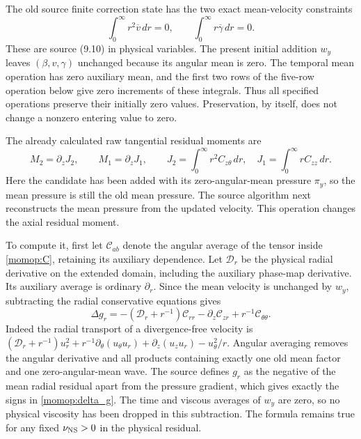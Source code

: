 \documentclass[11pt]{article}
\begin{document}
The old source finite correction state has the two exact mean-velocity
constraints
\[
 \int_0^\infty r^2\overline v\,dr=0,\qquad
 \int_0^\infty r\overline\gamma\,dr=0 .
\]
These are source (9.10) in physical variables. The present initial
addition $w_y$ leaves $(\beta,v,\gamma)$ unchanged because its angular
mean is zero. The temporal mean operation has zero auxiliary mean,
and the first two rows of the five-row operation below give zero
increments of these integrals. Thus all specified operations preserve
their initially zero values. Preservation, by itself, does not change
a nonzero entering value to zero.

The already calculated raw tangential residual moments are
\[
 M_2=\partial_zJ_2,\qquad M_1=\partial_zJ_1,\qquad
 J_2=\int_0^\infty r^2C_{z\theta}\,dr,\quad
 J_1=\int_0^\infty rC_{zz}\,dr.
\]
Here the candidate has been added with its zero-angular-mean pressure
$\pi_y$, so the mean pressure is still the old mean pressure.
The source algorithm next reconstructs the mean pressure from the
updated velocity. This operation changes the axial residual moment.

To compute it, first let $\mathcal C_{ab}$ denote the angular average
of the tensor inside \eqref{momop:C}, retaining its auxiliary dependence.
Let $\mathcal D_r$ be the physical radial derivative on the extended
domain, including the auxiliary phase-map derivative. Its auxiliary
average is ordinary $\partial_r$. Since the mean velocity is unchanged
by $w_y$, subtracting the radial conservative equations gives
\begin{equation}\label{momop:delta_g}
 \Delta g_r=-(\mathcal D_r+r^{-1})\mathcal C_{rr}
                   -\partial_z\mathcal C_{zr}
                   +r^{-1}\mathcal C_{\theta\theta}.
\end{equation}
Indeed the radial transport of a divergence-free velocity is
$(\mathcal D_r+r^{-1})u_r^2+
r^{-1}\partial_\theta(u_\theta u_r)+
\partial_z(u_zu_r)-u_\theta^2/r$.
Angular averaging removes the angular derivative and all products
containing exactly one old mean factor and one zero-angular-mean wave.
The source defines $g_r$ as the negative of the mean radial residual
apart from the pressure gradient, which gives exactly the signs in
\eqref{momop:delta_g}. The time and viscous averages of $w_y$
are zero, so no physical viscosity has been dropped in this subtraction.
The formula remains true for any fixed $\nu_{\rm NS}>0$ in the
physical residual.
\end{document}
